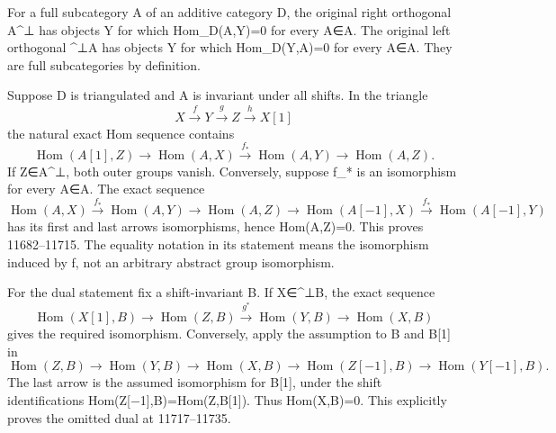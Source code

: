 \documentclass[11pt]{article}
\begin{document}
For a full subcategory A of an additive category D,\allowbreak{} the original right orthogonal A\^{}⊥ has objects Y for which Hom\_\allowbreak{}D(A,\allowbreak{}Y)\allowbreak{}\allowbreak{}=0 for every A\allowbreak{}∈A. The original left orthogonal \^{}⊥A has objects Y for which Hom\_\allowbreak{}D(Y,\allowbreak{}A)\allowbreak{}\allowbreak{}=0 for every A\allowbreak{}∈A. They are full subcategories by definition.

Suppose D is triangulated and A is invariant under all shifts. In the triangle \[
 X\xrightarrow fY\xrightarrow gZ\xrightarrow hX[1]
\] the natural exact Hom sequence contains \[
 \operatorname{Hom}(A[1],Z)\longrightarrow\operatorname{Hom}(A,X)
 \xrightarrow{f_*}\operatorname{Hom}(A,Y)
 \longrightarrow\operatorname{Hom}(A,Z).
\] If Z\allowbreak{}∈A\textasciicircum{}⊥,\allowbreak{} both outer groups vanish. Conversely,\allowbreak{} suppose f\_\allowbreak{}* is an isomorphism for every A\allowbreak{}∈A. The exact sequence \[
 \operatorname{Hom}(A,X)\xrightarrow{f_*}\operatorname{Hom}(A,Y)
 \longrightarrow\operatorname{Hom}(A,Z)
 \longrightarrow\operatorname{Hom}(A[-1],X)
 \xrightarrow{f_*}\operatorname{Hom}(A[-1],Y)
\] has its first and last arrows isomorphisms,\allowbreak{} hence Hom(A,\allowbreak{}Z)\allowbreak{}\allowbreak{}=0. This proves 11682–\allowbreak{}11715. The equality notation in its statement means the isomorphism induced by f,\allowbreak{} not an arbitrary abstract group isomorphism.

For the dual statement fix a shift-invariant B. If X\allowbreak{}∈\textasciicircum{}⊥B,\allowbreak{} the exact sequence \[
 \operatorname{Hom}(X[1],B)\longrightarrow\operatorname{Hom}(Z,B)
 \xrightarrow{g^*}\operatorname{Hom}(Y,B)
 \longrightarrow\operatorname{Hom}(X,B)
\] gives the required isomorphism. Conversely,\allowbreak{} apply the assumption to B and B[1]\allowbreak{} in \[
 \operatorname{Hom}(Z,B)\longrightarrow\operatorname{Hom}(Y,B)
 \longrightarrow\operatorname{Hom}(X,B)
 \longrightarrow\operatorname{Hom}(Z[-1],B)
 \longrightarrow\operatorname{Hom}(Y[-1],B).
\] The last arrow is the assumed isomorphism for B[1]\allowbreak{},\allowbreak{} under the shift identifications Hom(Z[−1]\allowbreak{},\allowbreak{}B)\allowbreak{}\allowbreak{}=Hom(Z,\allowbreak{}B[1]\allowbreak{})\allowbreak{}. Thus Hom(X,\allowbreak{}B)\allowbreak{}\allowbreak{}=0. This explicitly proves the omitted dual at 11717–\allowbreak{}11735.
\end{document}
